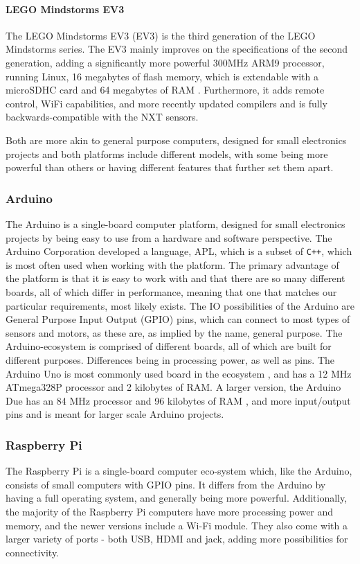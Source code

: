\paragraph{LEGO Mindstorms EV3}
The  LEGO Mindstorms EV3 (EV3) is the third generation of the LEGO Mindstorms series.
The EV3 mainly improves on the specifications of the second generation, adding a significantly more powerful 300MHz ARM9 processor, running Linux, 16 megabytes of flash memory, which is extendable with a microSDHC card and 64 megabytes of RAM \cite{ev3userguide}.
Furthermore, it adds remote control, WiFi capabilities, and more recently updated compilers and is fully backwards-compatible with the NXT sensors\cite{ev3nxtcompatability}.

Both are more akin to general purpose computers, designed for small electronics projects and both platforms include different models, with some being more powerful than others or having different features that further set them apart.


\subsubsection{Arduino}
The Arduino is a single-board computer platform, designed for small electronics projects by being easy to use from a hardware and software perspective.
The Arduino Corporation developed a language, APL, which is a subset of \texttt{C++}, which is most often used when working with the platform.
The primary advantage of the platform is that it is easy to work with and that there are so many different boards, all of which differ in performance, meaning that one that matches our particular requirements, most likely exists.
The IO possibilities of the Arduino are General Purpose Input Output (GPIO) pins, which can connect to most types of sensors and motors, as these are, as implied by the name, general purpose.
The Arduino-ecosystem is comprised of different boards, all of which are built for different purposes.
Differences being in processing power, as well as pins.
The Arduino Uno is most commonly used board in the ecosystem \cite{ArduinoUno3}, and has a 12 MHz ATmega328P processor and 2 kilobytes of RAM.
A larger version, the Arduino Due has an 84 MHz processor and 96 kilobytes of RAM \cite{ArduinoDue}, and more input/output pins and is meant for larger scale Arduino projects.

\subsubsection{Raspberry Pi}\label{subsec:rpispecs}
The Raspberry Pi is a single-board computer eco-system which, like the Arduino, consists of small computers with GPIO pins.
It differs from the Arduino by having a full operating system, and generally being more powerful.
Additionally, the majority of the Raspberry Pi computers have more processing power and memory, and the newer versions include a Wi-Fi module.
They also come with a larger variety of ports - both USB, HDMI and jack, adding more possibilities for connectivity.

